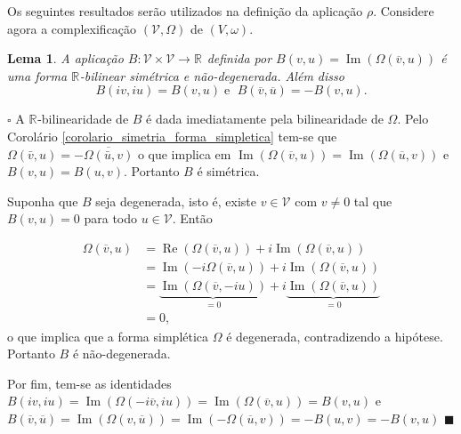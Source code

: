 \documentclass[12pt]{book}
\newtheorem{lema}[teorema]{Lema}
\newenvironment{prova}[1]{$\square$ #1}{\hfill$\blacksquare$}
\DeclareMathOperator{\Ima}{Im}
\DeclareMathOperator{\re}{Re}
\newcommand{\complexificado}[1]{\mathcal{#1}}
\newcommand{\formaSimpleticaExtendida}[2]{\Omega(#1, #2)}
\newcommand{\parteImaginaria}[1]{\Ima{(#1)}}
\newcommand{\parteReal}[1]{\re (#1)}
\newcommand{\real}[1]{\mathbb{R}^{#1}}
\newcommand{\reta}{\real{}}
\begin{document}
	Os seguintes resultados serão utilizados na definição da aplicação $\rho$. Considere agora a complexificação $(\complexificado{V}, \Omega)$ de $(V, \omega)$. 
	
	\begin{lema}\label{lema_forma_simetrica_B}
		A aplicação $B:\complexificado{V}\times \complexificado{V} \to \reta$ definida por $B(v, u ) = \parteImaginaria{\formaSimpleticaExtendida{\overline{v}}{u}}$ é uma forma $\reta$-bilinear simétrica e não-degenerada. Além disso
		$$
		B(iv,iu) = B(v,u)\;\text{e }\;B(\overline{v},\overline{u})=-B(v,u).
		$$
	\end{lema}
	\begin{prova} 
		A $\reta$-bilinearidade de $B$ é dada imediatamente pela bilinearidade de $\Omega$. Pelo Corolário \ref{corolario_simetria_forma_simpletica} tem-se que $\formaSimpleticaExtendida{\bar{v}}{u} = -\overline{\formaSimpleticaExtendida{\bar{u}}{v}}$ o que implica em $\parteImaginaria{\formaSimpleticaExtendida{\overline{v}}{u} } = \parteImaginaria{\formaSimpleticaExtendida{\overline{u}}{v} }$ e $B(v,u) = B(u,v)$. Portanto $B$ é simétrica.
		
		Suponha que $B$ seja degenerada, isto é, existe $v \in \complexificado{V}$ com $v\neq 0$ tal que $B(v, u ) = 0$ para todo $u \in \complexificado{V}$. Então
		
		$$
		\begin{aligned}
		\formaSimpleticaExtendida{\overline{v}}{u} &=\parteReal{\formaSimpleticaExtendida{\overline{v}}{u}} +i \parteImaginaria{\formaSimpleticaExtendida{\overline{v}}{u}} 
		\\
		&= \parteImaginaria{-i\formaSimpleticaExtendida{\overline{v}}{u}} +i \parteImaginaria{\formaSimpleticaExtendida{\overline{v}}{u}}
		\\
		&= \underbrace{\parteImaginaria{\formaSimpleticaExtendida{\overline{v}}{-iu}}}_{=0} +i \underbrace{\parteImaginaria{\formaSimpleticaExtendida{\overline{v}}{u}}}_{=0}
		\\
		&=0,
		\end{aligned}
		$$
		o que implica que a forma simplética $\Omega$ é degenerada, contradizendo a hipótese. Portanto $B$ é não-degenerada.
		
		Por fim, tem-se as identidades $B(iv,iu) = \parteImaginaria{\formaSimpleticaExtendida{-i\overline{v}}{iu}}= \parteImaginaria{\formaSimpleticaExtendida{\overline{v}}{u}}=B(v,u)$ e $B(\overline{v},\overline{u})  = \parteImaginaria{\formaSimpleticaExtendida{v}{\overline{u}}} = \parteImaginaria{-\formaSimpleticaExtendida{\overline{u}}{v}} = -B(u,v) = -B(v,u)$
	\end{prova}
	
\end{document}
